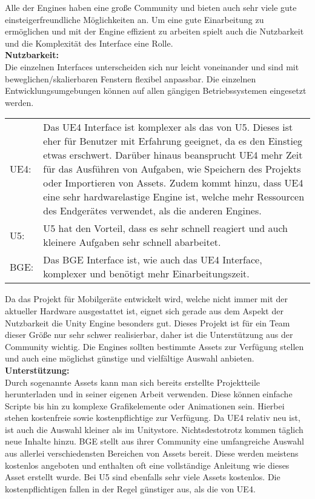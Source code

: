 Alle der Engines haben eine große Community und bieten auch sehr viele gute einsteigerfreundliche Möglichkeiten an. 
Um eine gute Einarbeitung zu ermöglichen und mit der Engine effizient zu arbeiten spielt auch die Nutzbarkeit und die Komplexität des Interface eine Rolle.\\

\textbf{Nutzbarkeit:}\\
Die einzelnen Interfaces unterscheiden sich nur leicht voneinander und sind mit beweglichen/skalierbaren Fenstern flexibel anpassbar. Die einzelnen Entwicklungsumgebungen können auf allen gängigen Betriebssystemen eingesetzt werden.
\begin{table}[H]
\centering
\begin{tabular}{lp{14.5cm}}
\ac{UE4}:& 
Das \ac{UE4} Interface ist komplexer als das von \ac{U5}. Dieses ist eher für Benutzer mit Erfahrung geeignet, da es den Einstieg etwas erschwert. Darüber hinaus beansprucht \ac{UE4} mehr Zeit für das Ausführen von Aufgaben, wie Speichern des Projekts oder Importieren von Assets. Zudem kommt hinzu, dass \ac{UE4} eine sehr hardwarelastige Engine ist, welche mehr Ressourcen des Endgerätes verwendet, als die anderen Engines.\\
\ac{U5}:&
\ac{U5} hat den Vorteil, dass es sehr schnell reagiert und auch kleinere Aufgaben sehr schnell abarbeitet.\\  
\ac{BGE}:&
Das \ac{BGE} Interface ist, wie auch das \ac{UE4} Interface, komplexer und benötigt mehr Einarbeitungszeit.
\end{tabular}
\end{table}
Da das Projekt für Mobilgeräte entwickelt wird, welche nicht immer mit der aktueller Hardware ausgestattet ist, eignet sich gerade aus dem Aspekt der Nutzbarkeit die Unity Engine besonders gut.
Dieses Projekt ist für ein Team dieser Größe nur sehr schwer realisierbar, daher ist die Unterstützung aus der Community wichtig. Die Engines sollten bestimmte Assets zur Verfügung stellen und auch eine möglichst günstige und vielfältige Auswahl anbieten.\\

\textbf{Unterstützung:}\\
Durch sogenannte Assets kann man sich bereits erstellte Projektteile herunterladen und in seiner eigenen Arbeit verwenden. Diese können einfache Scripte bis hin zu komplexe Grafikelemente oder Animationen sein. Hierbei stehen kostenfreie sowie kostenpflichtige zur Verfügung. Da \ac{UE4} relativ neu ist, ist auch die Auswahl kleiner als im Unitystore. Nichtsdestotrotz kommen täglich neue Inhalte hinzu. \ac{BGE} stellt aus ihrer Community eine umfangreiche Auswahl aus allerlei verschiedensten Bereichen von Assets bereit. Diese werden meistens kostenlos angeboten und enthalten oft eine vollständige Anleitung wie dieses Asset erstellt wurde. Bei \ac{U5} sind ebenfalls sehr viele Assets kostenlos. Die kostenpflichtigen fallen in der Regel günstiger aus, als die von \ac{UE4}.

